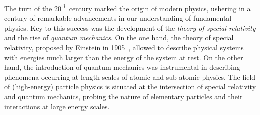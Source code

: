 %
%
%
%
%




The turn of the 20\textsuperscript{th} century marked the origin of modern
physics, ushering in a century of remarkable advancements in our understanding
of fundamental physics. Key to this success was the development of the
\emph{theory of special relativity} and the rise of \emph{quantum mechanics}. On
the one hand, the theory of special relativity, proposed by Einstein in
1905~\cite{einstein:1905zedbk,einstein:1905idtekvsea}, allowed to describe
physical systems with energies much larger than the energy of the system at
rest. On the other hand, the introduction of quantum mechanics was instrumental
in describing phenomena occurring at length scales of atomic and sub-atomic
physics. The field of (high-energy) particle physics is situated at the
intersection of special relativity and quantum mechanics, probing the nature of
elementary particles and their interactions at large energy scales.


